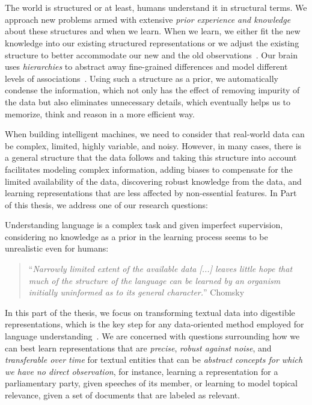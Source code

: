 \part{}
\label{part1}
%
The world is structured or at least, humans understand it in structural terms. We approach new problems armed with extensive \emph{prior experience and knowledge} about these structures and when we learn. 
When we learn, we either fit the new knowledge into our existing structured representations or we adjust the existing structure to better accommodate our new and the old observations~\citep{battaglia2018relational}.
%
Our brain uses \emph{hierarchies} to abstract away fine-grained differences and model different levels of associations~\citep{Ballard:2015}. Using such a structure as a prior, we automatically condense the information, which not only has the effect of removing impurity of the data but also eliminates unnecessary details, which eventually helps us to memorize, think and reason in a more efficient way.

When building intelligent machines, we need to consider that real-world data can be complex, limited, highly variable, and noisy. However, in many cases, there is a general structure that the data follows and taking this structure into account facilitates modeling complex information, adding biases to compensate for the limited availability of the data, discovering robust knowledge from the data, and learning representations that are less affected by non-essential features. 
%
In Part~\ref{part1} of this thesis, we address one of our research questions:

Understanding language is a complex task and given imperfect supervision, considering no knowledge as a prior in the learning process seems to be unrealistic even for humans: 
\begin{quote}
    ``\emph{Narrowly limited extent of the available data [...] leaves little hope that much of the structure of the language can be learned by an organism initially uninformed as to its general character.}'' Chomsky~\citep{chomsky1965}
\end{quote}

In this part of the thesis, we focus on transforming textual data into digestible representations, which is the key step for any data-oriented method employed for language understanding~\citep{Bengio:2013}. 
We are concerned with questions surrounding how we can best learn representations that are \emph{precise}, \emph{robust against noise}, and \emph{transferable over time} for textual entities that can be \emph{abstract concepts for which we have no direct observation}, for instance, learning a representation for a parliamentary party, given speeches of its member, or learning to model topical relevance, given a set of documents that are labeled as relevant.


